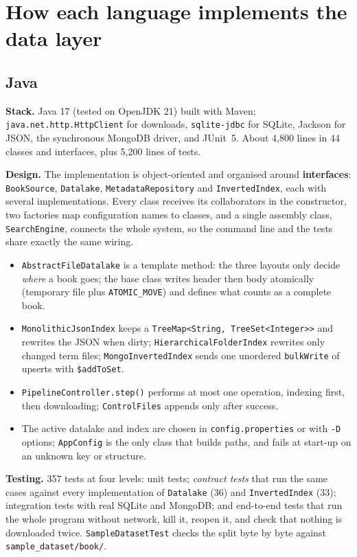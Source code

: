 \documentclass[11pt,a4paper]{article}
\newcommand{\code}[1]{\texttt{#1}}
\begin{document}
\section{How each language implements the data layer}\label{sec:impl}

\subsection{Java}
\textbf{Stack.} Java 17 (tested on OpenJDK 21) built with Maven; \code{java.net.http.HttpClient} for
downloads, \code{sqlite-jdbc} for SQLite, Jackson for JSON, the synchronous MongoDB driver, and
JUnit~5. About 4,800 lines in 44 classes and interfaces, plus 5,200 lines of tests.

\textbf{Design.} The implementation is object-oriented and organised around \textbf{interfaces}:
\code{BookSource}, \code{Datalake}, \code{MetadataRepository} and \code{InvertedIndex}, each with
several implementations. Every class receives its collaborators in the constructor, two factories
map configuration names to classes, and a single assembly class, \code{SearchEngine}, connects the
whole system, so the command line and the tests share exactly the same wiring.
\begin{itemize}
  \item \code{AbstractFileDatalake} is a template method: the three layouts only decide
        \emph{where} a book goes; the base class writes header then body atomically (temporary file
        plus \code{ATOMIC\_MOVE}) and defines what counts as a complete book.
  \item \code{MonolithicJsonIndex} keeps a \code{TreeMap<String, TreeSet<Integer>>} and rewrites the
        JSON when dirty; \code{HierarchicalFolderIndex} rewrites only changed term files;
        \code{MongoInvertedIndex} sends one unordered \code{bulkWrite} of upserts with \code{\$addToSet}.
  \item \code{PipelineController.step()} performs at most one operation, indexing first, then
        downloading; \code{ControlFiles} appends only after success.
  \item The active datalake and index are chosen in \code{config.properties} or with \code{-D}
        options; \code{AppConfig} is the only class that builds paths, and fails at start-up on an
        unknown key or structure.
\end{itemize}

\textbf{Testing.} 357 tests at four levels: unit tests; \emph{contract tests} that run the same
cases against every implementation of \code{Datalake} (36) and \code{InvertedIndex} (33);
integration tests with real SQLite and MongoDB; and end-to-end tests that run the whole program
without network, kill it, reopen it, and check that nothing is downloaded twice.
\code{SampleDatasetTest} checks the split byte by byte against \code{sample\_dataset/book/}.
\end{document}
